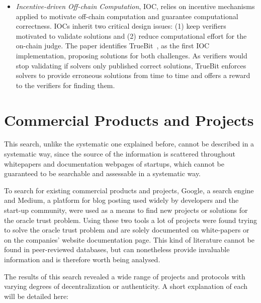 \documentclass[final,3p,12pt,twocolumn]{elsarticle}
\begin{document}
\begin{itemize}
  \item \textit{Incentive-driven Off-chain Computation}, IOC, relies on incentive mechanisms applied to motivate off-chain computation and guarantee computational correctness. IOCs inherit two critical design issues: (1) keep verifiers motivated to validate solutions and (2) reduce computational effort for the on-chain judge. The paper identifies TrueBit~\cite{Teutsch2017}, as the first IOC implementation, proposing solutions for both challenges. As verifiers would stop validating if solvers only published correct solutions, TrueBit enforces solvers to provide erroneous solutions from time to time and offers a reward to the verifiers for finding them.
\end{itemize}

\section{Commercial Products and Projects}\label{sec:4}

This search, unlike the systematic one explained before, cannot be described in a systematic way, since the source of the information is scattered throughout whitepapers and documentation webpages of startups, which cannot be guaranteed to be searchable and assessable in a systematic way.

To search for existing commercial products and projects, Google, a search engine and Medium, a platform for blog posting used widely by developers and the start-up community, were used as a means to find new projects or solutions for the oracle trust problem. Using these two tools a lot of projects were found trying to solve the oracle trust problem and are solely documented on white-papers or on the companies' website documentation page. This kind of literature cannot be found in peer-reviewed databases, but can nonetheless provide invaluable information and is therefore worth being analysed.

The results of this search revealed a wide range of projects and protocols with varying degrees of decentralization or authenticity. A short explanation of each will be detailed here:
\end{document}
